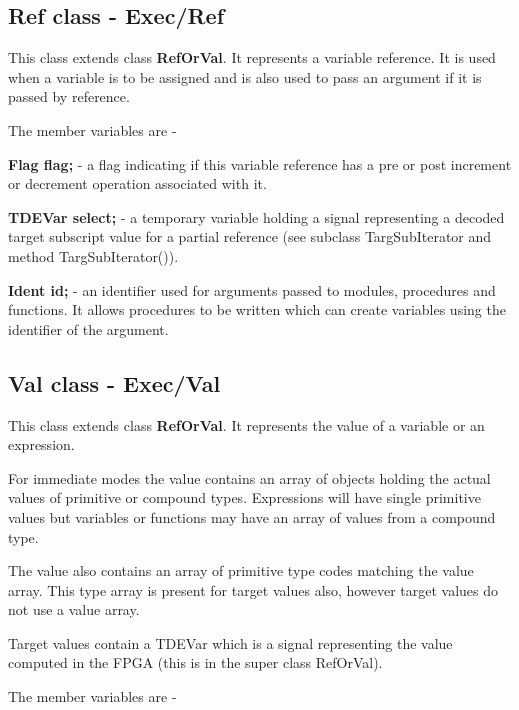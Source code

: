 \documentclass[10pt,a4paper,twoside,fleqn]{book}
\begin{document}
        \subsection{Ref class - Exec/Ref}

            This class extends class {\bf RefOrVal}. It represents a variable
            reference. It is used when a variable is to be assigned and is also
            used to pass an argument if it is passed by reference.

            The member variables are -

            {\bf Flag flag;} -  a flag indicating if this variable reference has a pre
            or post increment or decrement operation associated with it.

            {\bf TDEVar select;} - a temporary variable holding a signal representing
            a decoded target subscript value for a partial reference (see subclass
            TargSubIterator and method TargSubIterator()).

            {\bf Ident id;} - an identifier used for arguments passed to modules,
            procedures and functions. It allows procedures to be written which
            can create variables using the identifier of the argument.

        \subsection{Val class - Exec/Val}

            This class extends class {\bf RefOrVal}. It represents the value of
            a variable or an expression.

            For immediate modes the value contains an array of objects holding
            the actual values of primitive or compound types. Expressions will
            have single primitive values but variables or functions may have an
            array of values from a compound type.

            The value also contains an array of primitive type codes matching
            the value array. This type array is present for target values also,
            however target values do not use a value array.

            Target values contain a TDEVar which is a signal representing the
            value computed in the FPGA (this is in the super class RefOrVal).

            The member variables are -
\end{document}
